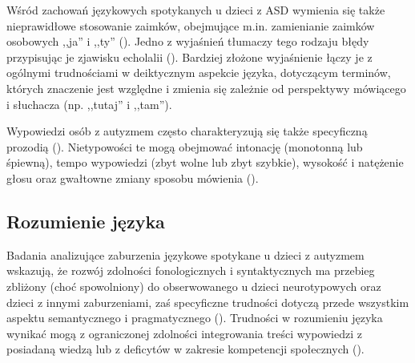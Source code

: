     Wśród zachowań językowych spotykanych u dzieci z ASD wymienia się także nieprawidłowe stosowanie zaimków, obejmujące m.in. zamienianie zaimków osobowych ,,ja'' i ,,ty'' (\cite{tager2005language}).
    Jedno z wyjaśnień tłumaczy tego rodzaju błędy przypisując je zjawisku echolalii (\cite{frith2008autyzm}).
    Bardziej złożone wyjaśnienie łączy je z ogólnymi trudnościami w deiktycznym aspekcie języka, dotyczącym terminów, których znaczenie jest względne i zmienia się zależnie od perspektywy mówiącego i słuchacza (np. ,,tutaj'' i ,,tam'').
    
    Wypowiedzi osób z autyzmem często charakteryzują się także specyficzną prozodią (\cite{tager2005language}).
    Nietypowości te mogą obejmować intonację (monotonną lub śpiewną), tempo wypowiedzi (zbyt wolne lub zbyt szybkie), wysokość i natężenie głosu oraz gwałtowne zmiany sposobu mówienia (\cite{frith2008autyzm}).
    
 
    

    \subsection{Rozumienie języka}
    Badania analizujące zaburzenia językowe spotykane u dzieci z autyzmem wskazują, że rozwój zdolności fonologicznych i syntaktycznych ma przebieg zbliżony (choć spowolniony) do obserwowanego u dzieci neurotypowych oraz dzieci z innymi zaburzeniami, zaś specyficzne trudności dotyczą przede wszystkim aspektu semantycznego i pragmatycznego (\cite{tager1981nature}).
    Trudności w rozumieniu języka wynikać mogą z ograniczonej zdolności integrowania treści wypowiedzi z posiadaną wiedzą lub z deficytów w zakresie kompetencji społecznych (\cite{tager2005language}).
    
